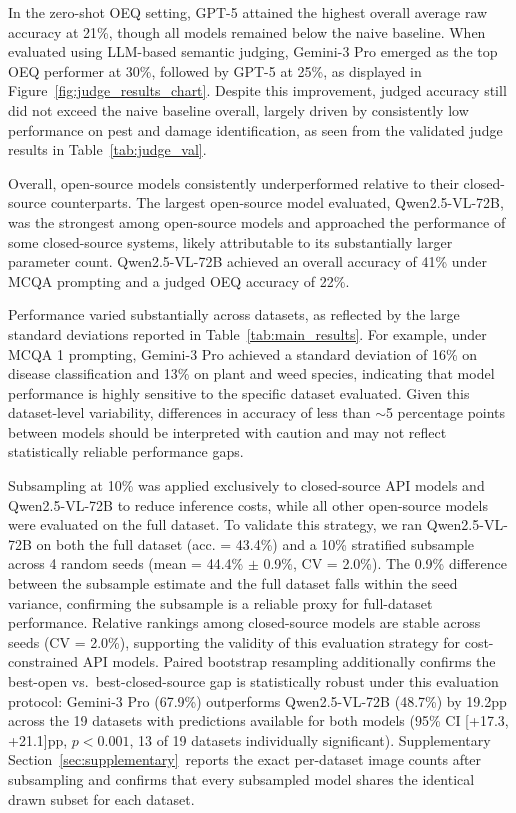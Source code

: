 \documentclass[10pt,letterpaper]{article}
\begin{document}
In the zero-shot OEQ setting, GPT-5 attained the highest overall average raw accuracy at 21\%, though all models remained below the naive baseline. When evaluated using LLM-based semantic judging, Gemini-3 Pro emerged as the top OEQ performer at 30\%, followed by GPT-5 at 25\%, as displayed in Figure~\ref{fig:judge_results_chart}. Despite this improvement, judged accuracy still did not exceed the naive baseline overall, largely driven by consistently low performance on pest and damage identification, as seen from the validated judge results in Table~\ref{tab:judge_val}.

Overall, open-source models consistently underperformed relative to their closed-source counterparts. The largest open-source model evaluated, Qwen2.5-VL-72B, was the strongest among open-source models and approached the performance of some closed-source systems, likely attributable to its substantially larger parameter count. Qwen2.5-VL-72B achieved an overall accuracy of 41\% under MCQA prompting and a judged OEQ accuracy of 22\%.

Performance varied substantially across datasets, as reflected by the large standard deviations reported in Table~\ref{tab:main_results}. For example, under MCQA 1 prompting, Gemini-3 Pro achieved a standard deviation of 16\% on disease classification and 13\% on plant and weed species, indicating that model performance is highly sensitive to the specific dataset evaluated. Given this dataset-level variability, differences in accuracy of less than $\sim$5 percentage points between models should be interpreted with caution and may not reflect statistically reliable performance gaps.

Subsampling at 10\% was applied exclusively to closed-source API models and Qwen2.5-VL-72B to reduce inference costs, while all other open-source models were evaluated on the full dataset. To validate this strategy, we ran Qwen2.5-VL-72B on both the full dataset (acc. = 43.4\%) and a 10\% stratified subsample across 4 random seeds (mean = 44.4\% $\pm$ 0.9\%, CV = 2.0\%). The 0.9\% difference between the subsample estimate and the full dataset falls within the seed variance, confirming the subsample is a reliable proxy for full-dataset performance. Relative rankings among closed-source models are stable across seeds (CV = 2.0\%), supporting the validity of this evaluation strategy for cost-constrained API models. Paired bootstrap resampling additionally confirms the best-open vs.\ best-closed-source gap is statistically robust under this evaluation protocol: Gemini-3 Pro (67.9\%) outperforms Qwen2.5-VL-72B (48.7\%) by 19.2pp across the 19 datasets with predictions available for both models (95\% CI [+17.3, +21.1]pp, $p < 0.001$, 13 of 19 datasets individually significant). Supplementary Section~\ref{sec:supplementary}\ reports the exact per-dataset image counts after subsampling and confirms that every subsampled model shares the identical drawn subset for each dataset.
\end{document}
